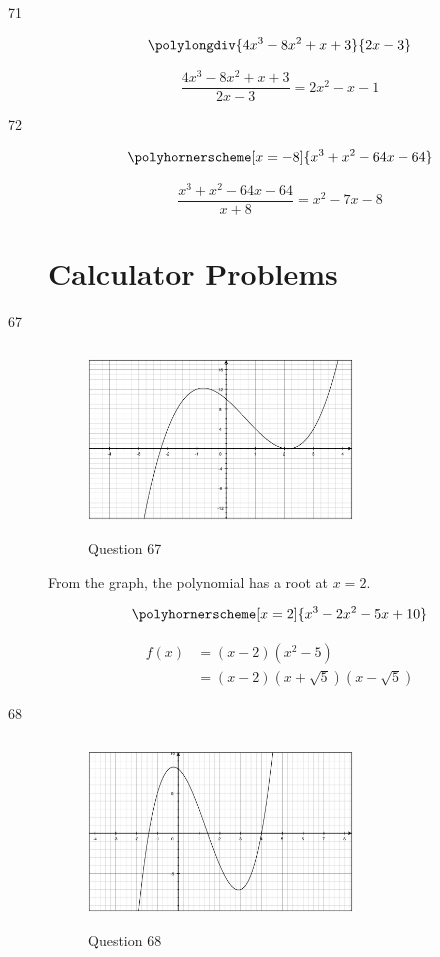 \documentclass[fleqn,addpoints]{exam}
\begin{document}
\begin{description}
\item[71]
\[ 
  \polylongdiv{4x^3 - 8x^2 + x + 3}{2x-3} 
\]

\[
  \frac{4x^3 - 8x^2 + x + 3}{2x-3} = 2x^2-x-1
\]

\item[72]
\[ 
  \polyhornerscheme[x=-8]{x^3 + x^2 - 64x - 64} \\
\]

\[
  \frac{x^3 + x^2 - 64x - 64}{x+8} = x^2-7x-8
\]

\section{Calculator Problems}
\item[67]
\begin{figure}[H]
  \centering
  \includegraphics[width=7cm,height=5cm]{question_67.eps}
  \caption*{Question 67}
\end{figure}

From the graph, the polynomial has a root at $x=2$.

\[
  \polyhornerscheme[x=2]{x^3-2x^2-5x+10} \\
\]

\begin{align*}
  f(x) &= (x-2)(x^2-5) \\
  &= (x-2)(x + \sqrt{5})(x - \sqrt{5})
\end{align*}

\item[68]
\begin{figure}[H]
  \centering
  \includegraphics[width=7cm,height=5cm]{question_68.eps}
  \caption*{Question 68}
\end{figure}


\end{description}
\end{document}
